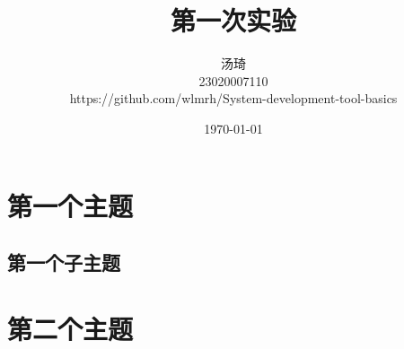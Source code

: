 \documentclass{article}
\begin{document}
    \title{第一次实验}
    \author{汤琦 \\ 23020007110\\ https://github.com/wlmrh/System-development-tool-basics}
    \date{\today}
    \maketitle

    \tableofcontents
    \newpage

    \setlength{\parindent}{0pt}
    \setcounter{page}{1}
    \sloppy
\section{第一个主题}
    \subsection{第一个子主题}
    
\section{第二个主题}
\end{document}
